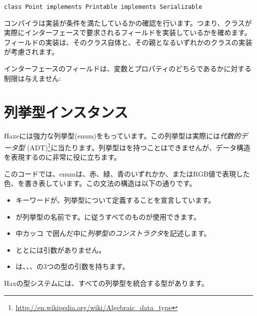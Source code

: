 \begin{lstlisting}
class Point implements Printable implements Serializable
\end{lstlisting}

コンパイラは実装が条件を満たしているかの確認を行います。つまり、クラスが実際にインターフェースで要求されるフィールドを実装しているかを確めます。フィールドの実装は、そのクラス自体と、その親となるいずれかのクラスの実装が考慮されます。

インターフェースのフィールドは、変数とプロパティのどちらであるかに対する制限は与えません:




\section{列挙型インスタンス}
\label{types-enum-instance}

Haxeには強力な列挙型(enum)をもっています。この列挙型は実際には\emph{代数的データ型} (ADT)\footnote{\url{http://en.wikipedia.org/wiki/Algebraic_data_type}}に当たります。列挙型はを持つことはできませんが、データ構造を表現するのに非常に役に立ちます。


このコードでは、enumは、赤、緑、青のいずれかか、またはRGB値で表現した色、を書き表しています。この文法の構造は以下の通りです。

\begin{itemize}
	\item {}キーワードが、列挙型について定義することを宣言しています。
	\item {}が列挙型の名前です。に従うすべてのものが使用できます。
	\item 中カッコ \expr{$\left\{\right\}$} で囲んだ中に\emph{列挙型のコンストラクタ}を記述します。
	\item {}ととには引数がありません。
	\item {}は、、、の3つの型の引数を持ちます。
\end{itemize}

Haxの型システムには、すべての列挙型を統合する型があります。

